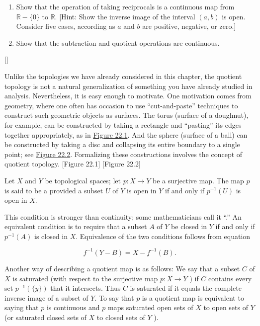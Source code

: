 \begin{enumerate}[itemsep=0.4em, parsep=0pt, topsep=0pt, partopsep=0pt, leftmargin=*, label=\arabic*., ref=\arabic*]
\begin{enumerate}[itemsep=0.2em, parsep=0pt, topsep=0pt, partopsep=0pt, leftmargin=*, label=(\alph*), align=left]
  \item Show that the operation of taking reciprocals is a continuous map from \(\mathbb{R} - \{ 0\}\) to \(\mathbb{R}\). [Hint: Show the inverse image of the interval \((a, b)\) is open. Consider five cases, according as \(a\) and \(b\) are positive, negative, or zero.]
  \item Show that the subtraction and quotient operations are continuous.
  \end{enumerate}
\end{enumerate}
[\protect\sectionDagger]

Unlike the topologies we have already considered in this chapter, the quotient topology is not a natural generalization of something you have already studied in analysis. Nevertheless, it is easy enough to motivate. One motivation comes from geometry, where one often has occasion to use ``cut-and-paste'' techniques to construct such geometric objects as surfaces. The torus (surface of a doughnut), for example, can be constructed by taking a rectangle and ``pasting'' its edges together appropriately, as in \hyperref[fig:22.1]{Figure 22.1}. And the sphere (surface of a ball) can be constructed by taking a disc and collapsing its entire boundary to a single point; see \hyperref[fig:22.2]{Figure 22.2}. Formalizing these constructions involves the concept of quotient topology.
\newpage
{}[Figure 22.1]
[Figure 22.2]
\begin{definition}
 Let \(X\) and \(Y\) be topological spaces; let \(p : X \rightarrow Y\) be a surjective map. The map \(p\) is said to be a  provided a subset \(U\) of \(Y\) is open in \(Y\) if and only if \(p^{-1}( U)\) is open in \(X\).
\end{definition}

This condition is stronger than continuity; some mathematicians call it ``.'' An equivalent condition is to require that a subset \(A\) of \(Y\) be closed in \(Y\) if and only if \(p^{-1}( A)\) is closed in \(X\). Equivalence of the two conditions follows from equation

\[
f^{-1}( {Y - B}) = X - f^{-1}( B).
\]

Another way of describing a quotient map is as follows: We say that a subset \(C\) of \(X\) is saturated (with respect to the surjective map \(p : X \rightarrow Y\) ) if \(C\) contains every set \(p^{-1}( {\{ y\} })\) that it intersects. Thus \(C\) is saturated if it equals the complete inverse image of a subset of \(Y\). To say that \(p\) is a quotient map is equivalent to saying that \(p\) is continuous and \(p\) maps saturated open sets of \(X\) to open sets of \(Y\) (or saturated closed sets of \(X\) to closed sets of \(Y\) ).


